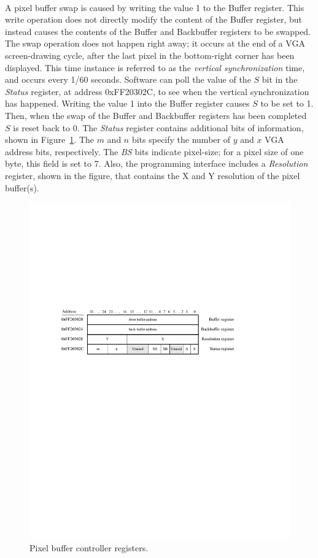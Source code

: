 \documentclass[epsfig,10pt,fullpage]{article}
\begin{document}
~\\
\noindent
A pixel buffer swap is caused by writing the value 1 to the Buffer register. This write
operation does not directly modify the content of the Buffer register, but instead causes
the contents of the Buffer and Backbuffer registers to be swapped. The swap operation does
not happen right away; it occurs at the end of a VGA screen-drawing cycle, after the last 
pixel in the bottom-right corner has been displayed. This time instance is referred to as
the {\it vertical synchronization} time, and occurs every 1/60 seconds. Software can poll the
value of the $S$ bit in the {\it Status} register, at address {\sf 0xFF20302C}, to see when 
the vertical synchronization has happened. Writing the value 1 into the Buffer register
causes $S$ to be set to 1. Then, when the swap of the Buffer and Backbuffer registers 
has been completed $S$ is reset back to 0. The {\it Status} register contains additional bits 
of information, shown in Figure~\ref{fig:pixel_ctrl}. The $m$ and $n$ bits specify the number 
of $y$ and $x$ VGA address bits, respectively. The {\it BS} bits indicate pixel-size; for
a pixel size of one byte, this field is set to 7. Also, the programming interface includes 
a {\it Resolution} register, shown in the figure, that contains the X and Y resolution of 
the pixel buffer(s).  

\begin{figure}[t]
   \begin{center}
       \includegraphics{figures/fig_DMA_ctrl.pdf}
   \end{center}
   \caption{Pixel buffer controller registers.}
	\label{fig:pixel_ctrl}
\end{figure}
\end{document}
